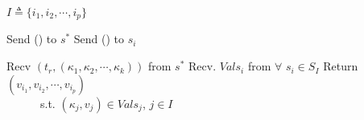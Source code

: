 \label{app:algrithmC}
\begin{algorithm}[!ht]
  \begin{algorithmic}[3]
      \begin{multicols}{0}{\footnotesize    
          \State $I\triangleq \{i_1, i_2, \cdots, i_p \}$
            \Part{ \underline{\readValuesAndTags}} {
          \State  Send  (\getTagArrayTag) to $s^*$
            \State  Send (\readValuesTag) to $s_i$
             \EndFor 
             
          \State  Recv $(t_r, ({\kappa}_1, {\kappa}_2, \cdots, {\kappa}_k))$ from  $s^*$
            \State Recv. $Vals_{i}$ from $\forall$ $s_i\in S_I$
            \State Return  $(v_{i_1}, v_{i_2}, \cdots, v_{i_p})$ 
            \\~~~~~~s.t.  $({\kappa}_{j}, v_{j}) \in Vals_{j}$, $j\in I$
          }\EndPart
        }\end{multicols}


\end{algorithmic}
\end{algorithm}
